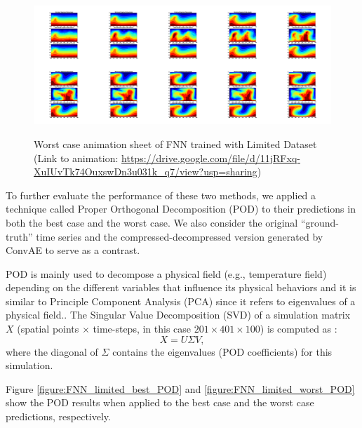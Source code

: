 \begin{figure}[H]
    \centering
    \caption{Worst case animation sheet of FNN trained with Limited Dataset (Link to animation: 
    \url{https://drive.google.com/file/d/11jRFxq-XuIUvTk74OuxswDn3u031k_q7/view?usp=sharing})}
    \includegraphics[scale=0.10]{figures/mantle_convection_images/limited_dataset/FNN_Worst_GIF_sheet.png}
    \label{figure:FNN_limited_worst_gif}
\end{figure}

To further evaluate the performance of these two methods, we applied a technique called Proper Orthogonal Decomposition (POD) to their predictions in both the best case and the worst case. We also consider the original ``ground-truth'' time series and the compressed-decompressed version generated by ConvAE to serve as a contrast.

POD is mainly used to decompose a physical field (e.g., temperature field) depending on the different variables that influence its physical behaviors and it is similar to Principle Component Analysis (PCA) since it refers to eigenvalues of a physical field.\citep{10.1146_annurev.fl.25.010193.002543}. The Singular Value Decomposition (SVD) of a simulation matrix $X$ (spatial points $\times$ time-steps, in this case $201 \times 401 \times 100$) is computed as \citep{10.1515_9783110671490-007}:
\begin{equation}
X = U\Sigma V,
\end{equation}
where the diagonal of $\Sigma$ contains the eigenvalues (POD coefficients) for this simulation.

Figure \ref{figure:FNN_limited_best_POD} and \ref{figure:FNN_limited_worst_POD} show the POD results when applied to the best case and the worst case predictions, respectively.

